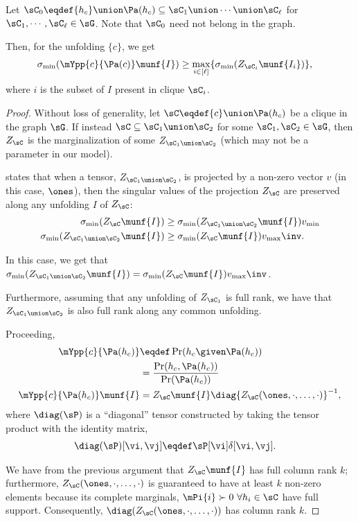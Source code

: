 \begin{lemma} 
  Let $\sC_0 \eqdef {h_c} \union \Pa(h_c) \subseteq \sC_1 \union \cdots
  \union \sC_\ell$ for $\sC_1, \cdots, \sC_\ell \in \sG$. Note that
  $\sC_0$ need not belong in the graph.

  Then, for the unfolding $\{c\}$, we get 
  \begin{align*}
    \sigma_{\min}(\mYpp{c}{\Pa(c)}\munf{I}) &\ge \max_{i\in[\ell]}\{\sigma_{\min}(Z_{\sC_i}\munf{I_i})\},
  \end{align*}
  where $i$ is the subset of $I$ present in clique $\sC_i$.
\end{lemma} 
\begin{proof}
Without loss of generality, let $\sC \eqdef \{c\} \union \Pa(h_c)$ be a clique
  in the graph $\sG$.
If instead $\sC \subseteq \sC_1 \union \sC_2$ for some $\sC_1, \sC_2 \in
\sG$, then $Z_{\sC}$ is the marginalization of some $Z_{\sC_1 \union \sC_2}$
(which may not be a parameter in our model). 

 states that when a tensor, $Z_{\sC_1 \union
\sC_2}$, is projected by a non-zero vector $v$ (in this case, $\ones$),
then the singular values of the projection $Z_\sC$ are preserved along
any unfolding $I$ of $Z_\sC$:
\begin{align*}
  \sigma_{\min}(Z_{\sC}\munf{I}) &\ge \sigma_{\min}(Z_{\sC_1 \union \sC_2}\munf{I})v_{\min} \\
  \sigma_{\min}(Z_{\sC_1 \union \sC_2}\munf{I}) &\ge
  \sigma_{\min}(Z_{\sC}\munf{I})v_{\max}\inv.
\end{align*}

In this case, we get that $\sigma_{\min}(Z_{\sC_1 \union \sC_2}\munf{I})
= \sigma_{\min}(Z_{\sC}\munf{I})v_{\max}\inv$.

Furthermore, assuming that any unfolding of $Z_{\sC_1}$ is full rank, we
have that $Z_{\sC_1 \union \sC_2}$ is also full rank along any common
unfolding. 

Proceeding,
\begin{align*}
\mYpp{c}{\Pa(h_c)} 
  &\eqdef \Pr(h_c \given \Pa(h_c)) \\
  &= \frac{\Pr(h_c, \Pa(h_c))}{\Pr(\Pa(h_c))} \\
  \mYpp{c}{\Pa(h_c)}\munf{I}
  &= Z_\sC\munf{I} \diag{Z_\sC(\ones, \cdot, \ldots, \cdot)}^{-1},
\end{align*}
where $\diag(\sP)$ is a ``diagonal'' tensor constructed by taking the
tensor product with the identity matrix,
\begin{align*}
  \diag(\sP)[\vi,\vj] &\eqdef \sP[\vi] \delta[\vi,\vj].
\end{align*}

We have from the previous argument that $Z_\sC\munf{I}$ has full column
rank $k$; furthermore, $Z_\sC(\ones, \cdot, \ldots, \cdot)$ is
guaranteed to have at least $k$ non-zero elements because its complete
marginals, $\mPi{i} \succ 0 ~\forall h_i \in \sC$ have full support. 
Consequently, $\diag(Z_\sC(\ones, \cdot, \ldots, \cdot))$ has column rank $k$.
\end{proof}

